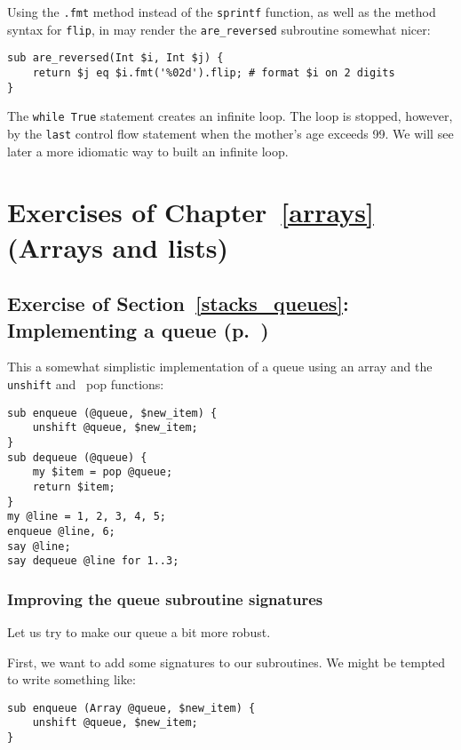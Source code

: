 Using the \verb'.fmt' method instead of the {\tt sprintf} 
function, as well as the method syntax for {\tt flip}, in 
may render the \verb'are_reversed' subroutine somewhat  
nicer:

\begin{verbatim}
sub are_reversed(Int $i, Int $j) {
    return $j eq $i.fmt('%02d').flip; # format $i on 2 digits
}
\end{verbatim}

The {\tt while True} statement creates an infinite loop. The 
loop is stopped, however, by the {\tt last} control flow 
statement when the mother's age exceeds 99. We will see 
later a more idiomatic way to built an infinite loop.

\section{Exercises of Chapter~\ref{arrays} (Arrays and lists)}

\subsection{Exercise of Section~\ref{stacks_queues}: Implementing a queue (p.~\pageref{exercise_queue})}
\label{sol_exercise_queue}

This a somewhat simplistic implementation of a queue using 
an array and the {\tt unshift} and {\ pop} functions:

\begin{verbatim}
sub enqueue (@queue, $new_item) {
    unshift @queue, $new_item;
}
sub dequeue (@queue) {
    my $item = pop @queue;
    return $item;
}
my @line = 1, 2, 3, 4, 5;
enqueue @line, 6;
say @line;
say dequeue @line for 1..3;
\end{verbatim}

\subsubsection{Improving the queue subroutine signatures}

Let us try to make our queue a bit more robust.

First, we want to add some signatures to our subroutines. We might be tempted to write something like:

\begin{verbatim}
sub enqueue (Array @queue, $new_item) {
    unshift @queue, $new_item;
}
\end{verbatim}

